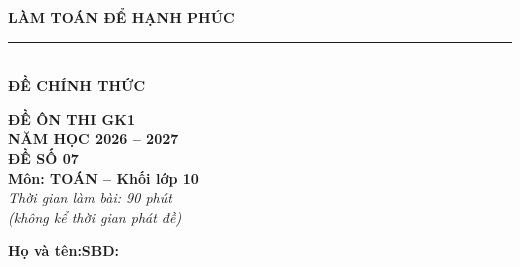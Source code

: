 \documentclass[12pt,a4paper]{article}
\begin{document}
\noindent
\begin{minipage}[c]{0.38\textwidth}
    \centering
    \textbf{LÀM TOÁN ĐỂ HẠNH PHÚC}\\[-2pt]
    \rule{3.2cm}{0.6pt}\\[4pt]
    \textbf{ĐỀ CHÍNH THỨC}
\end{minipage}\hfill
\begin{minipage}[c]{0.35\textwidth}
    \centering
    \textbf{ĐỀ ÔN THI GK1}\\
    \textbf{NĂM HỌC 2026 -- 2027}\\[2pt]
    \textbf{ĐỀ SỐ 07}\\
    \textbf{Môn: TOÁN -- Khối lớp 10}\\
    \textit{\small Thời gian làm bài: 90 phút\\(không kể thời gian phát đề)}
\end{minipage}

\vspace{0.2cm}
\noindent
\begin{minipage}[b]{0.78\textwidth}
    \textbf{Họ và tên:}\dotfill\textbf{SBD:}\makebox[3.5cm]{\dotfill}
\end{minipage}\hfill
\begin{minipage}[b]{0.20\textwidth}
    \hfill
    \setlength{\fboxrule}{0.8pt}%
\end{minipage}
\vspace{0.2cm}
\end{document}
